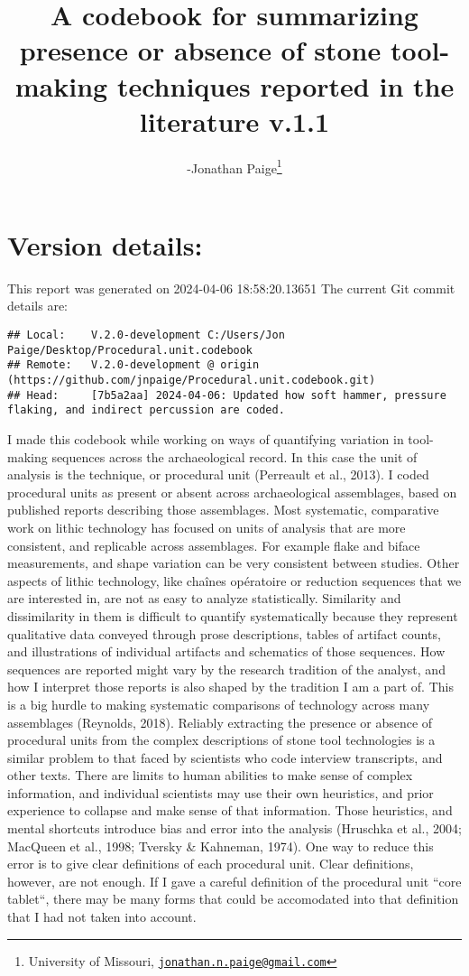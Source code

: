 \documentclass[
]{article}
\title{A codebook for summarizing presence or absence of stone
tool-making techniques reported in the literature v.1.1}
\author{-Jonathan Paige\footnote{University of Missouri,
  \href{mailto:jonathan.n.paige@gmail.com}{\nolinkurl{jonathan.n.paige@gmail.com}}}}
\date{}
\begin{document}
\maketitle

{
\setcounter{tocdepth}{3}
\tableofcontents
}
\hypertarget{version-details}{%
\section{Version details:}\label{version-details}}

This report was generated on 2024-04-06 18:58:20.13651 The current Git
commit details are:

\begin{verbatim}
## Local:    V.2.0-development C:/Users/Jon Paige/Desktop/Procedural.unit.codebook
## Remote:   V.2.0-development @ origin (https://github.com/jnpaige/Procedural.unit.codebook.git)
## Head:     [7b5a2aa] 2024-04-06: Updated how soft hammer, pressure flaking, and indirect percussion are coded.
\end{verbatim}

I made this codebook while working on ways of quantifying variation in
tool-making sequences across the archaeological record. In this case the
unit of analysis is the technique, or procedural unit (Perreault et al.,
2013). I coded procedural units as present or absent across
archaeological assemblages, based on published reports describing those
assemblages. Most systematic, comparative work on lithic technology has
focused on units of analysis that are more consistent, and replicable
across assemblages. For example flake and biface measurements, and shape
variation can be very consistent between studies. Other aspects of
lithic technology, like chaînes opératoire or reduction sequences that
we are interested in, are not as easy to analyze statistically.
Similarity and dissimilarity in them is difficult to quantify
systematically because they represent qualitative data conveyed through
prose descriptions, tables of artifact counts, and illustrations of
individual artifacts and schematics of those sequences. How sequences
are reported might vary by the research tradition of the analyst, and
how I interpret those reports is also shaped by the tradition I am a
part of. This is a big hurdle to making systematic comparisons of
technology across many assemblages (Reynolds, 2018). Reliably extracting
the presence or absence of procedural units from the complex
descriptions of stone tool technologies is a similar problem to that
faced by scientists who code interview transcripts, and other texts.
There are limits to human abilities to make sense of complex
information, and individual scientists may use their own heuristics, and
prior experience to collapse and make sense of that information. Those
heuristics, and mental shortcuts introduce bias and error into the
analysis (Hruschka et al., 2004; MacQueen et al., 1998; Tversky \&
Kahneman, 1974). One way to reduce this error is to give clear
definitions of each procedural unit. Clear definitions, however, are not
enough. If I gave a careful definition of the procedural unit ``core
tablet``, there may be many forms that could be accomodated into that
definition that I had not taken into account.
\end{document}
